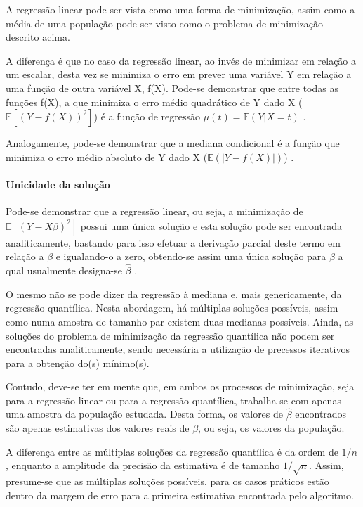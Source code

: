 \documentclass[a4paper, 12pt]{article}
\let\oldparagraph\paragraph
\renewcommand{\paragraph}[1]{\oldparagraph{#1}\mbox{}}
\begin{document}
A regressão linear pode ser vista como uma forma de minimização, assim
como a média de uma população pode ser visto como o problema de
minimização descrito acima.

A diferença é que no caso da regressão linear, ao invés de minimizar em
relação a um escalar, desta vez se minimiza o erro em prever uma
variável Y em relação a uma função de outra variável X, f(X). Pode-se
demonstrar que entre todas as funções f(X), a que minimiza o erro médio
quadrático de Y dado X (\(\mathbb{E}[(Y - f(X))^2]\)) é a função de
regressão \(\mu(t) = \mathbb{E}(Y|X=t)\) \autocite[49-50]{matloff2017}.

Analogamente, pode-se demonstrar que a mediana condicional é a função
que minimiza o erro médio absoluto de Y dado X
(\(\mathbb{E}(|Y-f(X)|)\)) \autocite[260-261]{matloff2017}.

\hypertarget{unicidade-da-solucao}{%
\paragraph{Unicidade da solução}\label{unicidade-da-solucao}}

Pode-se demonstrar que a regressão linear, ou seja, a minimização de
\(\mathbb{E}[(Y - X\beta)^2]\) possui uma única solução e esta solução
pode ser encontrada analiticamente, bastando para isso efetuar a
derivação parcial deste termo em relação a \(\beta\) e igualando-o a
zero, obtendo-se assim uma única solução para \(\beta\) a qual
usualmente designa-se \(\hat \beta\) \autocite[ver][49-50]{matloff2017}.

O mesmo não se pode dizer da regressão à mediana e, mais genericamente,
da regressão quantílica. Nesta abordagem, há múltiplas soluções
possíveis, assim como numa amostra de tamanho par existem duas medianas
possíveis. Ainda, as soluções do problema de minimização da regressão
quantílica não podem ser encontradas analiticamente, sendo necessária a
utilização de precessos iterativos para a obtenção do(s) mínimo(s).

Contudo, deve-se ter em mente que, em ambos os processos de minimização,
seja para a regressão linear ou para a regressão quantílica, trabalha-se
com apenas uma amostra da população estudada. Desta forma, os valores de
\(\hat \beta\) encontrados são apenas estimativas dos valores reais de
\(\beta\), ou seja, os valores da população.

A diferença entre as múltiplas soluções da regressão quantílica é da
ordem de \(1/n\), enquanto a amplitude da precisão da estimativa é de
tamanho \(1/\sqrt{n}\). Assim, presume-se que as múltiplas soluções
possíveis, para os casos práticos estão dentro da margem de erro para a
primeira estimativa encontrada pelo algoritmo.
\end{document}

